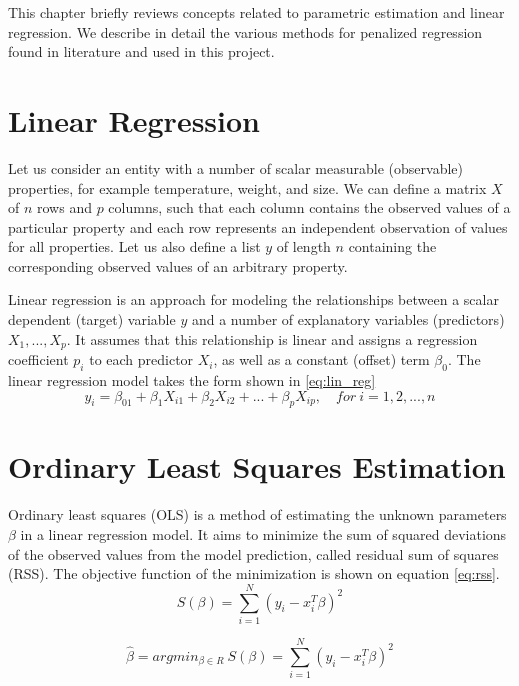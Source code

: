 This chapter briefly reviews concepts related to parametric estimation and linear regression. We describe in detail the various methods for penalized regression found in literature and used in this project.


\section{Linear Regression}
Let us consider an entity with a number of scalar measurable (observable) properties, for example temperature, weight, and size. We can define a matrix $X$ of $n$ rows and $p$ columns, such that each column contains the observed values of a particular property and each row represents an independent observation of values for all properties. Let us also define a list $y$ of length $n$ containing the corresponding observed values of an arbitrary property.

Linear regression is an approach for modeling the relationships between a scalar dependent (target) variable $y$ and a number of explanatory variables (predictors) $X_1,...,X_p$. It assumes that this relationship is linear and assigns a regression coefficient $p_i$ to each predictor $X_i$, as well as a constant (offset) term $\beta_0$. The linear regression model takes the form shown in \ref{eq:lin_reg}
\begin{equation} \label{eq:lin_reg}
y_i = \beta_01+\beta_1X_{i1}+\beta_2X_{i2}+...+\beta_pX_{ip}, \quad for\ i=1,2,...,n
\end{equation}


\section{Ordinary Least Squares Estimation}
Ordinary least squares (OLS) is a method of estimating the unknown parameters $\beta$ in a linear regression model. It aims to minimize the sum of squared deviations of the observed values from the model prediction, called residual sum of squares (RSS). The objective function of the minimization is shown on equation \ref{eq:rss}. 
\begin{equation} \label{eq:rss}
S(\beta) = \sum_{i=1}^{N} (y_i - x_i^T\beta)^2
\end{equation}

\begin{equation} \label{eq:beta_estimation}
\hat{\beta} = argmin_{\beta \in R}\ S(\beta) = \sum_{i=1}^{N} (y_i - x_i^T\beta)^2
\end{equation}

